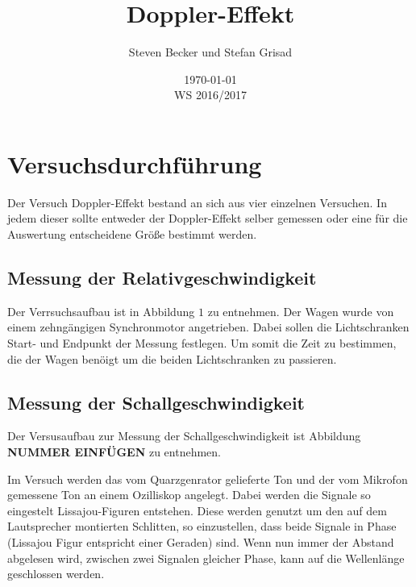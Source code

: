 \documentclass[parskip=half]{scrartcl} %
\author{Steven Becker und Stefan Grisad}
\title{Doppler-Effekt}
\date{\today\\WS 2016/2017}
\begin{document}
\maketitle
%
\section{Versuchsdurchführung}

Der Versuch Doppler-Effekt bestand an sich aus vier einzelnen Versuchen.
In jedem dieser sollte entweder der Doppler-Effekt selber gemessen oder eine 
für die Auswertung entscheidene Größe bestimmt werden.

\subsection{Messung der Relativgeschwindigkeit}

%
%

Der Verrsuchsaufbau ist in Abbildung $1$ zu entnehmen. 
Der Wagen wurde von einem zehngängigen Synchronmotor angetrieben.
Dabei sollen die Lichtschranken Start- und Endpunkt der Messung festlegen.
Um somit die Zeit zu bestimmen, die der Wagen benöigt um die beiden 
Lichtschranken zu passieren.



\subsection{Messung der Schallgeschwindigkeit}

Der Versusaufbau zur Messung der Schallgeschwindigkeit ist
Abbildung \textbf{ NUMMER EINFÜGEN} zu entnehmen.

Im Versuch werden das vom Quarzgenrator gelieferte Ton und der 
vom Mikrofon gemessene Ton an einem Ozilliskop angelegt.
Dabei werden die Signale so eingestelt Lissajou-Figuren entstehen.
Diese werden genutzt um den auf dem Lautsprecher montierten Schlitten, so 
einzustellen, dass beide Signale in Phase (Lissajou Figur entspricht einer Geraden) sind. 
Wenn nun immer der Abstand abgelesen wird, zwischen zwei 
Signalen gleicher Phase, kann auf die Wellenlänge geschlossen werden.
\end{document}
